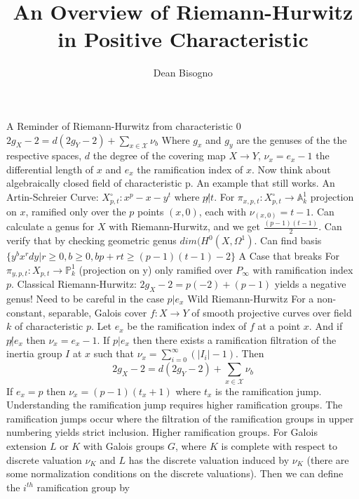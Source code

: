 \documentclass{article}
\begin{document}
\title{An Overview of Riemann-Hurwitz in Positive Characteristic}
\author{Dean Bisogno}
\maketitle
{}
\begin{outline}[enumerate]
   \1 A Reminder of Riemann-Hurwitz from characteristic 0
   		\2 $2g_{X} - 2 = d(2g_{Y} -2) + \sum_{x \in \mathcal{X}} \nu_b$ 
   			\3 Where $g_x$ and $g_y$ are the genuses of the the respective spaces, $d$ the degree of the covering map $X \to Y$, $\nu_x = e_x - 1$ the differential length of $x$ and $e_x$ the ramification index of $x$.
   \1 Now think about algebraically closed field of characteristic p. An example that still works.
   		\2 An Artin-Schreier Curve: $X^{\circ}_{p,t}: x^p - x -y^t$ where $p \not | t$.
   		\2 For $\pi_{x,p,t}: X^{\circ}_{p,t} \to \mathbb{A}^{1}_{k}$ projection on $x$, ramified only over the $p$ points $(x,0)$, each with $\nu_{(x,0)} = t-1$.
   		\2 Can calculate a genus for $X$ with Riemann-Hurwitz, and we get $\frac{(p-1)(t-1)}{2}$. Can verify that by checking geometric genus $dim(H^{0}(X,\Omega^{1})$. Can find basis $\{y^b x^r dy | r \geq 0, b \geq 0, bp + rt \geq (p - 1)(t - 1) -2\}$
   \1 A Case that breaks
         \2 For $\pi_{y,p,t}: X_{p,t} \to \mathbb{P}^{1}_{k}$ (projection on y) only ramified over $P_{\infty}$ with ramification index $p$.
         \2 Classical Riemann-Hurwitz: $2g_X - 2 = p(-2)+(p-1)$ yields a negative genus!
         \2 Need to be careful in the case $p | e_x$
   \1 Wild Riemann-Hurwitz
   	     \2 For a non-constant, separable, Galois cover $f:X \to Y$ of smooth projective curves over field $k$ of characteristic $p$. Let $e_x$ be the ramification index of $f$ at a point $x$. And if $p \not | e_x$ then $\nu_x = e_x -1$. If $p | e_x$ then there exists a ramification filtration of the inertia group $I$ at $x$ such that $\nu_x = \sum_{i=0}^{\infty}(|I_i| - 1)$. Then
   	     $$
   		 2g_{X} - 2 = d(2g_{Y} -2) + \sum_{x \in \mathcal{X}} \nu_b 
   	     $$
   	     \2 If $e_x = p$ then $\nu_x = (p-1)(t_x + 1)$ where $t_x$ is the ramification jump. Understanding the ramification jump requires higher ramification groups. The ramification jumps occur where the filtration of the ramification groups in upper numbering yields strict inclusion.
           \2 Higher ramification groups.
               \3 For Galois extension $L$ or $K$ with Galois groups $G$, where $K$ is complete with respect to discrete valuation $\nu_K$ and $L$ has the discrete valuation induced by $\nu_K$ (there are some normalization conditions on the discrete valuations). Then we can define the $i^{th}$ ramification group by

\end{outline}
\end{document}
